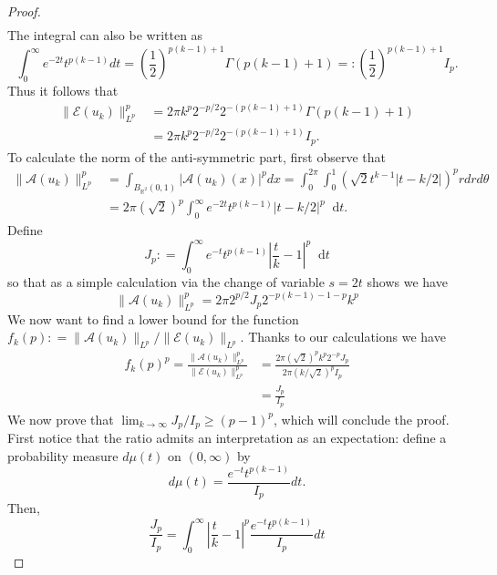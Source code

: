 \documentclass[10pt,a4paper]{amsart}
\newcommand{\R}{\mathbb{R}}
\newcommand{\abs}[1]{|#1|}
\newcommand*\diff{\mathop{}\!\mathrm{d}}
\newcommand{\norm}[1]{\|#1\|}
\begin{document}
\begin{proof}
\begin{align*}
\end{align*}
The integral can also be written as
\begin{equation*}
\int_0^\infty e^{-2t} t^{p(k-1)} dt =
\left(\frac{1}{2}\right)^{p(k-1)+1}
\Gamma(p(k-1)+1)
=\mathrel{:}\left(\frac{1}{2}\right)^{p(k-1)+1}I_p.
\end{equation*}
Thus it follows that
\begin{align*}
\norm{\mathcal E(u_k)}_{L^p}^p
&= 2\pi k^p 2^{-p/2} 2^{-(p(k-1)+1)}
\Gamma(p(k-1)+1)\\
&=2\pi k^p 2^{-p/2} 2^{-(p(k-1)+1)} I_p.
\end{align*}
To calculate the norm of the anti-symmetric part,
first observe that 
\begin{align*}
\norm{\mathcal A(u_k)}_{L^p}^p& =
\int_{B_{\R^2}(0,1)} \abs{\mathcal A(u_k)(x)}^p dx
= \int_0^{2\pi} \int_0^1
\left(
\sqrt{2} t^{k-1} \abs{t - k/2}
\right)^p r dr d\theta\\
&= 2\pi (\sqrt{2})^p\int_0^\infty e^{-2t} t^{p(k-1)}
\abs{t - k/2}^p \diff t.
\end{align*}
Define 
\begin{equation*}
J_p\mathrel{:}=\int_0^\infty e^{-t} t^{p(k-1)}
\left|\frac tk - 1\right|^p\diff t
\end{equation*}
so that as a simple calculation via the
change of variable $s=2t$ shows we have
\begin{equation*}
\norm{\mathcal A(u_k)}_{L^p}^p
=2\pi 2^{p/2} J_p 2^{-p(k-1)-1-p}k^p
\end{equation*}
We now want to find a lower bound for the function
$f_k(p) \mathrel{:}=
\norm{\mathcal A(u_k)}_{L^p}/
\norm{\mathcal E(u_k)}_{L^p}$.
Thanks to our calculations we have
\begin{align}
f_k(p)^p = \frac{\norm{\mathcal A(u_k)}_{L^p}^p}
{\norm{\mathcal E(u_k)}_{L^p}^p}
&= \frac{2\pi (\sqrt{2})^p k^p2^{-p} J_p}
{2\pi (k/\sqrt{2})^p I_p}
\nonumber \\
&= \frac{J_p}{I_p} \label{eq:fk_ratio} 
\end{align}
We now prove that $\lim_{k\to \infty} J_p/I_p\ge (p-1)^p$,
which will conclude the proof.
First notice that the ratio admits
an interpretation as an expectation: 
define a probability measure
$d\mu(t)$ on $(0, \infty)$ by
\begin{equation}
 d\mu(t) = \frac{e^{-t} t^{p(k-1)}}{I_p} dt. 
\end{equation}
Then,
\begin{equation}
\frac{J_p}{I_p}
= \int_0^\infty \left|\frac tk - 1\right|^p
\frac{e^{-t} t^{p(k-1)}}{I_p} dt

\end{equation}
\end{proof}
\end{document}
